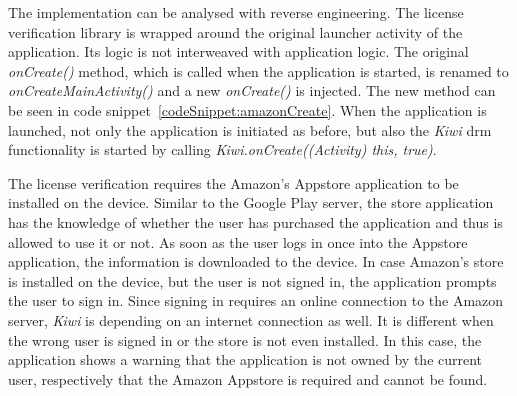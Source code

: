 \newline
The implementation can be analysed with reverse engineering.
The license verification library is wrapped around the original launcher activity of the application.
Its logic is not interweaved with application logic.
The original \textit{onCreate()} method, which is called when the application is started, is renamed to \textit{onCreateMainActivity()} and a new \textit{onCreate()} is injected.
The new method can be seen in code snippet~\ref{codeSnippet:amazonCreate}.
When the application is launched, not only the application is initiated as before, but also the \textit{Kiwi} \gls{drm} functionality is started by calling \textit{Kiwi.onCreate((Activity) this, true)}.
\newline

The license verification requires the Amazon's Appstore application to be installed on the device.
Similar to the Google Play server, the store application has the knowledge of whether the user has purchased the application and thus is allowed to use it or not.
As soon as the user logs in once into the Appstore application, the information is downloaded to the device.
In case Amazon's store is installed on the device, but the user is not signed in, the application prompts the user to sign in.
Since signing in requires an online connection to the Amazon server, \textit{Kiwi} is depending on an internet connection as well.
It is different when the wrong user is signed in or the store is not even installed.
In this case, the application shows a warning that the application is not owned by the current user, respectively that the Amazon Appstore is required and cannot be found.
